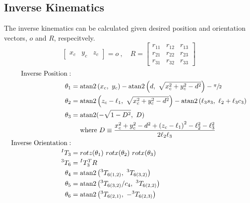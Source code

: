 \documentclass[12pt]{report}
\begin{document}
\subsection{Inverse Kinematics}
The inverse kinematics can be calculated given desired position and orientation vectors, $o$ and $R$, respecitvely.
\[
\begin{bmatrix}x_c & y_c & z_c \end{bmatrix} = o~,\quad
  R =
  \begin{bmatrix}
    r_{11} & r_{12} & r_{13} \\
    r_{21} & r_{22} & r_{23} \\
    r_{31} & r_{32} & r_{33}
  \end{bmatrix}
\]
\begin{equation}
\begin{aligned}
\quad\text{Inverse Position}: \\
\theta_{1}&= \text{atan2} \left(x_{c},~ y_{c}\right) - \text{atan2}\left(d,~\sqrt{x_c^2 + y_c^2 -d^2}\right) - \sfrac{\pi}{2}\\
\theta_{2}&= \text{atan2} \left(z_c - \ell_1, ~\sqrt{x_c^2 + y_c^2 - d^2}\right) - \text{atan2}\left(\ell_3s_3,~\ell_2 + \ell_3c_3\right) \\
\theta_{3}&= \text{atan2} (-\sqrt{1-D^{2}},~ D) \\
& \quad \text { where } D\equiv\frac{x_{c}^{2}+y_{c}^{2}-d^{2}+\left(z_{c}-\ell_{1}\right)^{2}-\ell_{2}^{2}-\ell_{3}^{2}}{2 \ell_{2} \ell_{3}} \\
\quad\text{Inverse Orientation}:\\
^IT_3 &= rotz(\theta_1)~rotx(\theta_2)~rotx(\theta_3) \\
{}^3T_6 &= {}^IT_3^TR \\ %
\theta_4 &= \text{atan2} \left({}^3T_{6(1,2)},~{}^3T_{6(3,2)}\right) \\
\theta_5 &= \text{atan2} \left({{}^3T_{6(3,2)}} / {c_4},~{}^3T_{6(2,2)}\right) \\
\theta_6 &= \text{atan2} \left({}^3T_{6(2,1)},~ -{}^3T_{6(2,3)}\right) \\
\end{aligned}
\nonumber
\end{equation}
\newpage
\end{document}
